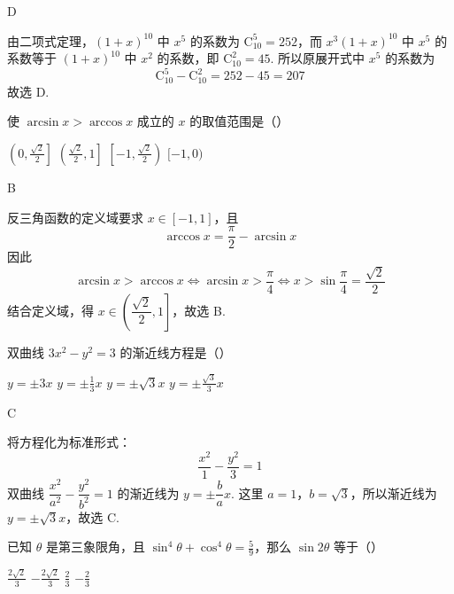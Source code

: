 \begin{answer}
D
\end{answer}

\begin{solution}
由二项式定理，\((1+x)^{10}\) 中 \(x^5\) 的系数为 \(\mathrm C_{10}^{5}=252\)，而 \(x^3(1+x)^{10}\) 中 \(x^5\) 的系数等于 \((1+x)^{10}\) 中 \(x^2\) 的系数，即 \(\mathrm C_{10}^{2}=45\). 所以原展开式中 \(x^5\) 的系数为
\[
\mathrm C_{10}^{5}-\mathrm C_{10}^{2}=252-45=207
\]
故选 D.
\end{solution}

\begin{problem}
使 \(\arcsin x > \arccos x\) 成立的 \(x\) 的取值范围是（\quad）

\choices
    {\(\left(0, \frac{\sqrt{2}}{2}\right]\)}
    {\(\left(\frac{\sqrt{2}}{2}, 1\right]\)}
    {\(\left[-1, \frac{\sqrt{2}}{2}\right)\)}
    {\([-1, 0)\)}
\end{problem}

\begin{answer}
B
\end{answer}

\begin{solution}
反三角函数的定义域要求 \(x\in[-1,1]\)，且
\[
\arccos x=\frac{\pi}{2}-\arcsin x
\]
因此
\[
\arcsin x>\arccos x\Longleftrightarrow \arcsin x>\frac{\pi}{4}
\Longleftrightarrow x>\sin\frac{\pi}{4}=\frac{\sqrt2}{2}
\]
结合定义域，得 \(x\in\left(\dfrac{\sqrt2}{2},1\right]\)，故选 B.
\end{solution}

\begin{problem}
双曲线 \(3x^{2} - y^{2} = 3\) 的渐近线方程是（\quad）

\choices
    {\(y = \pm 3x \)}
    {\(y = \pm \frac{1}{3} x \)}
    {\(y = \pm \sqrt{3} x \)}
    {\(y = \pm \frac{\sqrt{3}}{3} x \)}
\end{problem}

\begin{answer}
C
\end{answer}

\begin{solution}
将方程化为标准形式：
\[
\frac{x^2}{1}-\frac{y^2}{3}=1
\]
双曲线 \(\dfrac{x^2}{a^2}-\dfrac{y^2}{b^2}=1\) 的渐近线为 \(y=\pm\dfrac ba x\). 这里 \(a=1\)，\(b=\sqrt3\)，所以渐近线为 \(y=\pm\sqrt3 x\)，故选 C.
\end{solution}

\begin{problem}
已知 \(\theta\) 是第三象限角，且 \(\sin^4\theta + \cos^4\theta = \frac{5}{9}\)，那么 \(\sin 2\theta\) 等于（\quad）

\choices
    {\(\frac{2\sqrt{2}}{3}\)}
    {\(-\frac{2\sqrt{2}}{3}\)}
    {\(\frac{2}{3}\)}
    {\(-\frac{2}{3}\)}
\end{problem}

